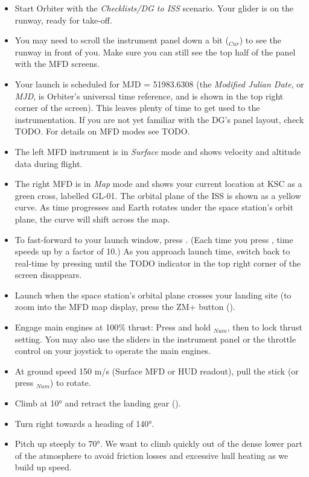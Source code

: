 \documentclass[Orbiter User Manual.tex]{subfiles}
\begin{document}
\begin{itemize}
\item Start Orbiter with the \textit{Checklists/DG to ISS} scenario. Your glider is on the runway, ready for take-off.
\item You may need to scroll the instrument panel down a bit (\UArrow$_{Cur}$) to see the runway in front of you. Make sure you can still see the top half of the panel with the MFD screens.
\item Your launch is scheduled for MJD = 51983.6308 (the \textit{Modified Julian Date}, or \textit{MJD}, is Orbiter's universal time reference, and is shown in the top right corner of the screen). This leaves plenty of time to get used to the instrumentation. If you are not yet familiar with the DG's panel layout, check TODO. For details on MFD modes see TODO.
\item The left MFD instrument is in \textit{Surface} mode and shows velocity and altitude data during flight.
\item The right MFD is in \textit{Map} mode and shows your current location at KSC as a green cross, labelled GL-01. The orbital plane of the ISS is shown as a yellow curve. As time progresses and Earth rotates under the space station's orbit plane, the curve will shift across the map.
\item To fast-forward to your launch window, press . (Each time you press , time speeds up by a factor of 10.) As you approach launch time, switch back to real-time by pressing  until the TODO indicator in the top right corner of the screen disappears.
\item Launch when the space station's orbital plane crosses your landing site (to zoom into the MFD map display, press the ZM+ button (\Shift{}).
\item Engage main engines at 100\% thrust: Press and hold \keystroke{+}$_{Num}$, then \Ctrl to lock thrust setting. You may also use the sliders in the instrument panel or the throttle control on your joystick to operate the main engines.
\item At ground speed 150 m/s (Surface MFD or HUD readout), pull the stick (or press $_{Num}$) to rotate.
\item Climb at 10° and retract the landing gear ().
\item Turn right towards a heading of 140°.
\item Pitch up steeply to 70°. We want to climb quickly out of the dense lower part of the atmosphere to avoid friction losses and excessive hull heating as we build up speed.

\end{itemize}
\end{document}
